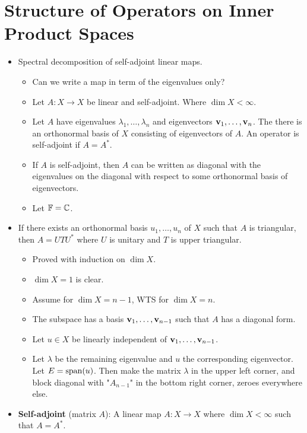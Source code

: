 \documentclass[../../notes.tex]{subfiles}
\begin{document}
\chapter{Structure of Operators on Inner Product Spaces}
\begin{itemize}
    \item {}Spectral decomposition of self-adjoint linear maps.
    \begin{itemize}
        \item Can we write a map in term of the eigenvalues only?
        \item Let $A:X\to X$ be linear and self-adjoint. Where $\dim X<\infty$.
        \item Let $A$ have eigenvalues $\lambda_1,\dots,\lambda_n$ and eigenvectors $\mathbf{v}_1,\dots,\mathbf{v}_n$. The there is an orthonormal basis of $X$ consisting of eigenvectors of $A$. An operator is self-adjoint if $A=A^*$.
        \item If $A$ is self-adjoint, then $A$ can be written as diagonal with the eigenvalues on the diagonal with respect to some orthonormal basis of eigenvectors.
        \item Let $\mathbb{F}=\mathbb{C}$.
    \end{itemize}
    \item If there exists an orthonormal basis $u_1,\dots,u_n$ of $X$ such that $A$ is triangular, then $A=UTU^*$ where $U$ is unitary and $T$ is upper triangular.
    \begin{itemize}
        \item Proved with induction on $\dim X$.
        \item $\dim X=1$ is clear.
        \item Assume for $\dim X=n-1$, WTS for $\dim X=n$.
        \item The subspace has a basis $\mathbf{v}_1,\dots,\mathbf{v}_{n-1}$ such that $A$ has a diagonal form.
        \item Let $u\in X$ be linearly independent of $\mathbf{v}_1,\dots,\mathbf{v}_{n-1}$.
        \item Let $\lambda$ be the remaining eigenvalue and $u$ the corresponding eigenvector. Let $E=\operatorname{span}(u)$. Then make the matrix $\lambda$ in the upper left corner, and block diagonal with "$A_{n-1}$" in the bottom right corner, zeroes everywhere else.
    \end{itemize}
    \item \textbf{Self-adjoint} (matrix $A$): A linear map $A:X\to X$ where $\dim X<\infty$ such that $A=A^*$.
    \begin{itemize}

\end{itemize}
\end{itemize}
\end{document}

